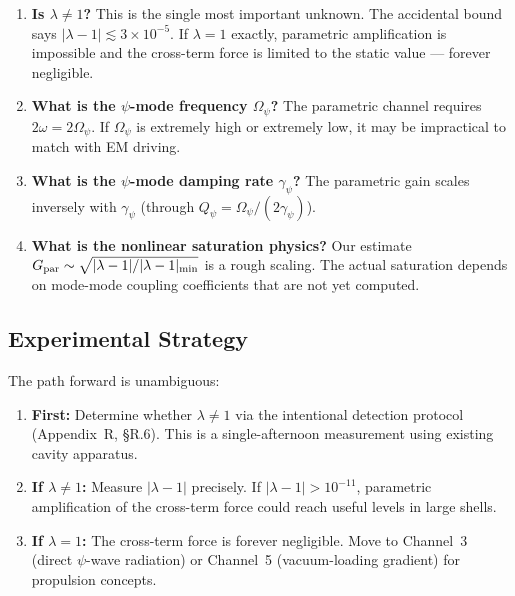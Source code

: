 \documentclass[11pt]{article}
\begin{document}
\begin{enumerate}
\item \textbf{Is $\lambda \neq 1$?}
  This is the single most important unknown. The accidental bound says
  $|\lambda - 1| \lesssim 3 \times 10^{-5}$. If $\lambda = 1$ exactly,
  parametric amplification is impossible and the cross-term force is
  limited to the static value --- forever negligible.

\item \textbf{What is the $\psi$-mode frequency $\Omega_\psi$?}
  The parametric channel requires $2\omega = 2\Omega_\psi$.
  If $\Omega_\psi$ is extremely high or extremely low, it may be
  impractical to match with EM driving.

\item \textbf{What is the $\psi$-mode damping rate $\gamma_\psi$?}
  The parametric gain scales inversely with $\gamma_\psi$ (through
  $Q_\psi = \Omega_\psi/(2\gamma_\psi)$).

\item \textbf{What is the nonlinear saturation physics?}
  Our estimate $G_{\rm par} \sim \sqrt{|\lambda-1|/|\lambda-1|_{\rm min}}$
  is a rough scaling. The actual saturation depends on mode-mode coupling
  coefficients that are not yet computed.
\end{enumerate}

\subsection{Experimental Strategy}

The path forward is unambiguous:
\begin{enumerate}
\item \textbf{First:} Determine whether $\lambda \neq 1$ via the
  intentional detection protocol (Appendix~R, \S R.6). This is a
  single-afternoon measurement using existing cavity apparatus.
\item \textbf{If $\lambda \neq 1$:} Measure $|\lambda - 1|$ precisely.
  If $|\lambda - 1| > 10^{-11}$, parametric amplification of the
  cross-term force could reach useful levels in large shells.
\item \textbf{If $\lambda = 1$:} The cross-term force is forever
  negligible. Move to Channel~3 (direct $\psi$-wave radiation) or
  Channel~5 (vacuum-loading gradient) for propulsion concepts.
\end{enumerate}
\end{document}
